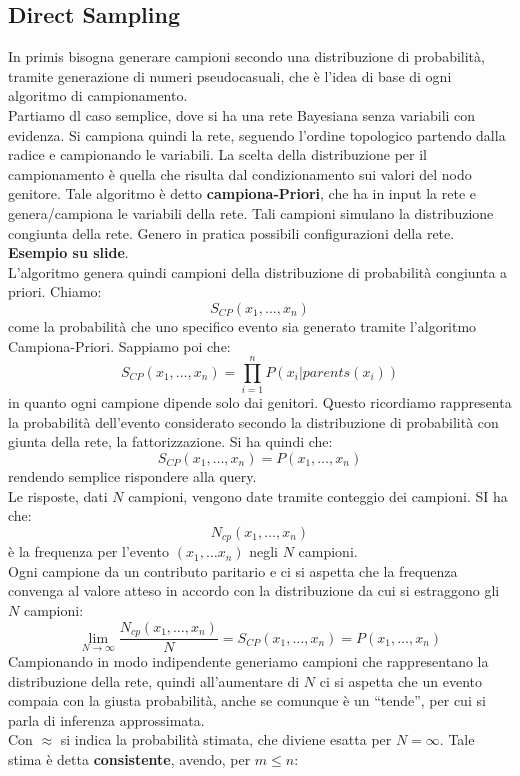 \message{ !name(modprob.tex)}\documentclass[a4paper,12pt, oneside]{book}
\begin{document}
\subsection{Direct Sampling}
In primis bisogna generare campioni secondo una distribuzione di probabilità,
tramite generazione di numeri pseudocasuali, che è l'idea di base di ogni
algoritmo di campionamento. \\
Partiamo dl caso semplice, dove si ha una rete Bayesiana senza variabili con
evidenza. Si campiona quindi la rete, seguendo l'ordine topologico partendo
dalla radice e campionando le variabili. La scelta della distribuzione per il
campionamento è quella che risulta dal condizionamento sui valori del nodo
genitore. Tale algoritmo è detto \textbf{campiona-Priori}, che ha in input la
rete e genera/campiona le variabili della rete. Tali campioni simulano la
distribuzione congiunta della rete. Genero in pratica possibili configurazioni
della rete. \\
\textbf{Esempio su slide}.\\
L'algoritmo genera quindi campioni della distribuzione di probabilità congiunta
a priori. Chiamo:
\[S_{CP}(x_1,\ldots,x_n)\]
come la probabilità che uno specifico evento sia generato tramite l’algoritmo
Campiona-Priori. Sappiamo poi che:
\[S_{CP}(x_1,\ldots,x_n)=\prod_{i=1}^nP(x_i|parents(x_i))\]
in quanto ogni campione dipende solo dai genitori. Questo ricordiamo rappresenta
la probabilità dell'evento considerato secondo la distribuzione di probabilità
con giunta della rete, la fattorizzazione. Si ha quindi che:
\[S_{CP}(x_1,\ldots,x_n)=P(x_1,\ldots,x_n)\]
rendendo semplice rispondere alla query.\\
Le risposte, dati $N$ campioni, vengono date tramite conteggio dei campioni. SI
ha che:
\[N_{cp}(x_1,\ldots,x_n)\]
è la frequenza per l'evento $(x_1,\ldots x_n)$ negli $N$ campioni.\\
Ogni campione da un contributo paritario e ci si aspetta che la frequenza
convenga al valore atteso in accordo con la distribuzione da cui si estraggono
gli $N$ campioni:
\[\lim_{N\to\infty}\frac{N_{cp}(x_1,\ldots,x_n)}{N}
  =S_{CP}(x_1,\ldots,x_n)=P(x_1,\ldots,x_n)\]
Campionando in modo indipendente generiamo campioni che rappresentano la
distribuzione della rete, quindi all'aumentare di $N$ ci si aspetta che un
evento compaia con la giusta probabilità, anche se comunque è un ``tende'', per
cui si parla di inferenza approssimata.\\
Con $\approx$ si indica la probabilità stimata, che diviene esatta per
$N=\infty$. Tale stima è detta \textbf{consistente}, avendo, per $m\leq n$:
\end{document}
